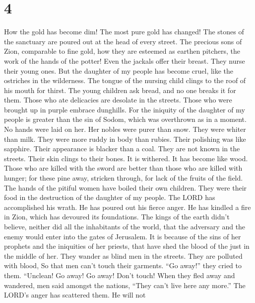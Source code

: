 \hypertarget{section-3}{%
\section{4}\label{section-3}}

 How the gold has become dim! The most pure gold has
changed! The stones of the sanctuary are poured out at the head of every
street.  The precious sons of Zion, comparable to fine gold,
how they are esteemed as earthen pitchers, the work of the hands of the
potter!  Even the jackals offer their breast. They nurse
their young ones. But the daughter of my people has become cruel, like
the ostriches in the wilderness.  The tongue of the nursing
child clings to the roof of his mouth for thirst. The young children ask
bread, and no one breaks it for them.  Those who ate
delicacies are desolate in the streets. Those who were brought up in
purple embrace dunghills.  For the iniquity of the daughter
of my people is greater than the sin of Sodom, which was overthrown as
in a moment. No hands were laid on her.  Her nobles were
purer than snow. They were whiter than milk. They were more ruddy in
body than rubies. Their polishing was like sapphire.  Their
appearance is blacker than a coal. They are not known in the streets.
Their skin clings to their bones. It is withered. It has become like
wood.  Those who are killed with the sword are better than
those who are killed with hunger; for these pine away, stricken through,
for lack of the fruits of the field.  The hands of the
pitiful women have boiled their own children. They were their food in
the destruction of the daughter of my people.  The LORD has
accomplished his wrath. He has poured out his fierce anger. He has
kindled a fire in Zion, which has devoured its foundations.
 The kings of the earth didn't believe, neither did all the
inhabitants of the world, that the adversary and the enemy would enter
into the gates of Jerusalem.  It is because of the sins of
her prophets and the iniquities of her priests, that have shed the blood
of the just in the middle of her.  They wander as blind men
in the streets. They are polluted with blood, So that men can't touch
their garments.  ``Go away!'' they cried to them.
``Unclean! Go away! Go away! Don't touch! When they fled away and
wandered, men said amongst the nations, ``They can't live here any
more.''  The LORD's anger has scattered them. He will not
